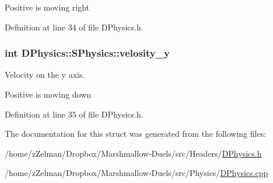 Positive is moving right 

Definition at line 34 of file D\-Physics.\-h.

\hypertarget{structDPhysics_1_1SPhysics_a58c1f8fa61d0aeece450d7ab789c5013}{
\subsubsection[{velosity\-\_\-y}]{\setlength{\rightskip}{0pt plus 5cm}int D\-Physics\-::\-S\-Physics\-::velosity\-\_\-y}}\label{structDPhysics_1_1SPhysics_a58c1f8fa61d0aeece450d7ab789c5013}


Velocity on the y axis. 

Positive is moving down 

Definition at line 35 of file D\-Physics.\-h.



The documentation for this struct was generated from the following files\-:\begin{DoxyCompactItemize}
\item 
/home/z\-Zelman/\-Dropbox/\-Marshmallow-\/\-Duels/src/\-Headers/\hyperlink{DPhysics_8h}{D\-Physics.\-h}\item 
/home/z\-Zelman/\-Dropbox/\-Marshmallow-\/\-Duels/src/\-Physics/\hyperlink{DPhysics_8cpp}{D\-Physics.\-cpp}\end{DoxyCompactItemize}
